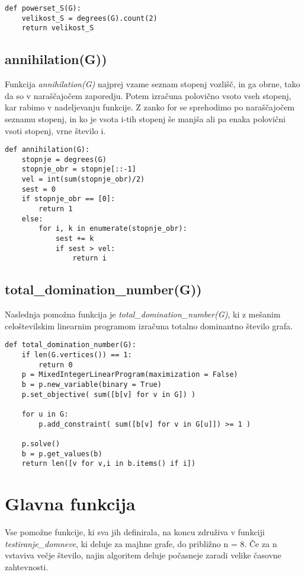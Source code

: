 \documentclass[11pt, a4paper]{article}
\begin{document}
\begin{verbatim}
def powerset_S(G):
    velikost_S = degrees(G).count(2)
    return velikost_S
\end{verbatim}

\subsection{\textbf{annihilation(G))}}
Funkcija \textit{annihilation(G)} najprej vzame seznam stopenj vozlišč, in ga obrne, tako da so v naraščajočem zaporedju. Potem izračuna polovično vsoto vseh stopenj, kar rabimo v nadeljevanju funkcije. Z zanko for se sprehodimo po naraščajočem seznamu stopenj, in ko je vsota i-tih stopenj še manjša ali pa enaka polovični vsoti stopenj, vrne število i. 

\begin{verbatim}
def annihilation(G):
    stopnje = degrees(G)
    stopnje_obr = stopnje[::-1]
    vel = int(sum(stopnje_obr)/2)
    sest = 0
    if stopnje_obr == [0]: 
        return 1
    else:
        for i, k in enumerate(stopnje_obr):
            sest += k
            if sest > vel:
                return i
\end{verbatim}

\subsection{\textbf{total\_domination\_number(G))}}
Naslednja pomožna funkcija je \textit{total\_domination\_number(G)}, ki z mešanim celoštevilskim linearnim programom izračuna totalno dominantno število grafa. 

\begin{verbatim}
def total_domination_number(G):
    if len(G.vertices()) == 1:
        return 0
    p = MixedIntegerLinearProgram(maximization = False)
    b = p.new_variable(binary = True)
    p.set_objective( sum([b[v] for v in G]) )

    for u in G:
        p.add_constraint( sum([b[v] for v in G[u]]) >= 1 )

    p.solve()
    b = p.get_values(b)
    return len([v for v,i in b.items() if i])
\end{verbatim}

\section{\textbf{Glavna funkcija}}
Vse pomožne funkcije, ki sva jih definirala, na koncu združiva v funkciji \textit{testiranje\_domneve}, ki deluje za majhne grafe, do približno n = 8. Če za n vstaviva večje število, najin algoritem deluje počasneje zaradi velike časovne zahtevnosti. 
\end{document}
